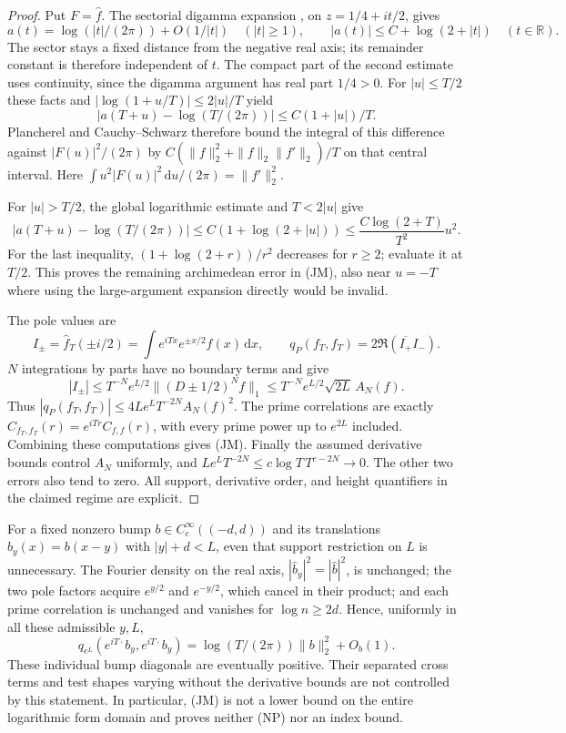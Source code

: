 \documentclass[11pt]{article}
\theoremstyle{remark}\newtheorem{remark}[theorem]{Remark}
\newcommand{\R}{\mathbb R}
\newcommand{\dd}{\,\mathrm d}
\begin{document}
\begin{proof}
Put $F=\widehat f$. The sectorial digamma expansion
\cite[eq.~(5.11.2), \S5.11(ii)]{DLMFGamma}, on
$z=1/4+it/2$, gives
\[
 a(t)=\log(|t|/(2\pi))+O(1/|t|)\quad(|t|\ge1),
 \qquad |a(t)|\le C+\log(2+|t|)\quad(t\in\R).
\]
The sector stays a fixed distance from the negative real axis;
its remainder constant is therefore independent of $t$.
The compact part of the second estimate uses continuity, since
the digamma argument has real part $1/4>0$.
For $|u|\le T/2$ these facts and
$|\log(1+u/T)|\le2|u|/T$ yield
\[
 |a(T+u)-\log(T/(2\pi))|\le C(1+|u|)/T.
\]
Plancherel and Cauchy--Schwarz therefore bound the integral
of this difference against $|F(u)|^2/(2\pi)$ by
$C(\|f\|_2^2+\|f\|_2\|f'\|_2)/T$ on that central interval.
Here $\int u^2|F(u)|^2\dd u/(2\pi)=\|f'\|_2^2$.

For $|u|>T/2$, the global logarithmic estimate and
$T<2|u|$ give
\[
 |a(T+u)-\log(T/(2\pi))|
     \le C(1+\log(2+|u|))
     \le\frac{C\log(2+T)}{T^2}u^2.
\]
For the last inequality, $(1+\log(2+r))/r^2$ decreases for
$r\ge2$; evaluate it at $T/2$. This proves the remaining
archimedean error in (JM), also near $u=-T$ where using
the large-argument expansion directly would be invalid.

The pole values are
\[
 I_\pm=\widehat f_T(\pm i/2)
             =\int e^{iTx}e^{\pm x/2}f(x)\dd x,
 \qquad q_P(f_T,f_T)=2\Re(\overline{I_+}I_-).
\]
$N$ integrations by parts have no boundary terms and give
\[
 |I_\pm|\le T^{-N}e^{L/2}
                    \|(D\pm1/2)^Nf\|_1
        \le T^{-N}e^{L/2}\sqrt{2L}\,A_N(f).
\]
Thus $|q_P(f_T,f_T)|\le4Le^LT^{-2N}A_N(f)^2$.
The prime correlations are exactly
$C_{f_T,f_T}(r)=e^{iTr}C_{f,f}(r)$, with every prime power
up to $e^{2L}$ included. Combining these computations gives (JM).
Finally the assumed derivative bounds control $A_N$ uniformly,
and $Le^LT^{-2N}\le c\log T\,T^{c-2N}\to0$.
The other two errors also tend to zero. All support, derivative
order, and height quantifiers in the claimed regime are explicit.
\end{proof}

For a fixed nonzero bump $b\in C_c^\infty((-d,d))$ and its
translations $b_y(x)=b(x-y)$ with $|y|+d<L$, even that support
restriction on $L$ is unnecessary. The Fourier density on the
real axis, $|\widehat b_y|^2=|\widehat b|^2$, is unchanged; the
two pole factors acquire $e^{y/2}$ and $e^{-y/2}$, which cancel
in their product; and each prime correlation is unchanged and
vanishes for $\log n\ge2d$. Hence, uniformly in all these
admissible $y,L$,
\[
 q_{e^L}(e^{iT\cdot}b_y,e^{iT\cdot}b_y)
       =\log(T/(2\pi))\|b\|_2^2+O_b(1).
\]
These individual bump diagonals are eventually positive.
Their separated cross terms and test shapes varying without
the derivative bounds are not controlled by this statement.
In particular, (JM) is not a lower bound on the entire
logarithmic form domain and proves neither (NP) nor an index bound.
\end{document}
